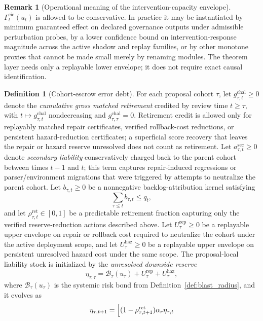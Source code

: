 \documentclass[11pt]{article}
\theoremstyle{definition}
\newtheorem{definition}[theorem]{Definition}
\newtheorem{remark}[theorem]{Remark}
\newcommand{\1}{\mathbf{1}}
\begin{document}
\begin{remark}[Operational meaning of the intervention-capacity envelope]\label{rem:cic_proxy}
$\Gamma_t^{\mathrm{cic}}(u_t)$ is allowed to be conservative. In practice it may be instantiated by minimum guaranteed effect on declared governance outputs under admissible perturbation probes, by a lower confidence bound on intervention-response magnitude across the active shadow and replay families, or by other monotone proxies that cannot be made small merely by renaming modules. The theorem layer needs only a replayable lower envelope; it does not require exact causal identification.
\end{remark}

\begin{definition}[Cohort-escrow error debt]\label{def:cohort_escrow}
For each proposal cohort $\tau$, let $g_{\tau,t}^{\mathrm{chal}}\ge 0$ denote the \emph{cumulative gross matched retirement} credited by review time $t\ge \tau$, with $t\mapsto g_{\tau,t}^{\mathrm{chal}}$ nondecreasing and $g_{\tau,\tau}^{\mathrm{chal}}=0$. Retirement credit is allowed only for replayably matched repair certificates, verified rollback-cost reductions, or persistent hazard-reduction certificates; a superficial score recovery that leaves the repair or hazard reserve unresolved does not count as retirement. Let $a_{\tau,t}^{\mathrm{sec}}\ge 0$ denote \emph{secondary liability} conservatively charged back to the parent cohort between times $t-1$ and $t$; this term captures repair-induced regressions or parser/environment migrations that were triggered by attempts to neutralize the parent cohort. Let $b_{\tau,t}\ge0$ be a nonnegative backlog-attribution kernel satisfying
\[
\sum_{\tau\le t} b_{\tau,t}\le q_t,
\]
and let $\rho_{\tau,t}^{\mathrm{ret}}\in[0,1]$ be a predictable retirement fraction capturing only the verified reserve-reduction actions described above. Let $U_{\tau}^{\mathrm{rep}}\ge 0$ be a replayable upper envelope on repair or rollback cost required to neutralize the cohort under the active deployment scope, and let $U_{\tau}^{\mathrm{haz}}\ge 0$ be a replayable upper envelope on persistent unresolved hazard cost under the same scope. The proposal-local liability stock is initialized by the \emph{unresolved downside reserve}
\[
\eta_{\tau,\tau}=\mathcal B_{\tau}(u_{\tau})+U_{\tau}^{\mathrm{rep}}+U_{\tau}^{\mathrm{haz}},
\]
where $\mathcal B_{\tau}(u_{\tau})$ is the systemic risk bond from Definition~\ref{def:blast_radius}, and it evolves as
\[
\eta_{\tau,t+1}
=
\Bigl[
(1-\rho_{\tau,t+1}^{\mathrm{ret}})\alpha_r \eta_{\tau,t}
\]
\end{definition}
\end{document}
